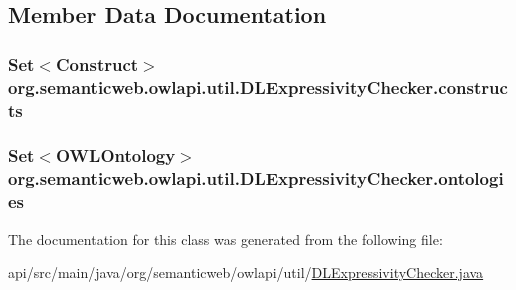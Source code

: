 \subsection{Member Data Documentation}
\hypertarget{classorg_1_1semanticweb_1_1owlapi_1_1util_1_1_d_l_expressivity_checker_a9c9585989f8385c0009afa34268200ec}{
\subsubsection[{constructs}]{\setlength{\rightskip}{0pt plus 5cm}Set$<${\bf Construct}$>$ org.\-semanticweb.\-owlapi.\-util.\-D\-L\-Expressivity\-Checker.\-constructs\hspace{0.3cm}{\ttfamily [private]}}}\label{classorg_1_1semanticweb_1_1owlapi_1_1util_1_1_d_l_expressivity_checker_a9c9585989f8385c0009afa34268200ec}
\hypertarget{classorg_1_1semanticweb_1_1owlapi_1_1util_1_1_d_l_expressivity_checker_affc39ee4929c0905abba809420579080}{
\subsubsection[{ontologies}]{\setlength{\rightskip}{0pt plus 5cm}Set$<${\bf O\-W\-L\-Ontology}$>$ org.\-semanticweb.\-owlapi.\-util.\-D\-L\-Expressivity\-Checker.\-ontologies\hspace{0.3cm}{\ttfamily [private]}}}\label{classorg_1_1semanticweb_1_1owlapi_1_1util_1_1_d_l_expressivity_checker_affc39ee4929c0905abba809420579080}


The documentation for this class was generated from the following file\-:\begin{DoxyCompactItemize}
\item 
api/src/main/java/org/semanticweb/owlapi/util/\hyperlink{_d_l_expressivity_checker_8java}{D\-L\-Expressivity\-Checker.\-java}\end{DoxyCompactItemize}

